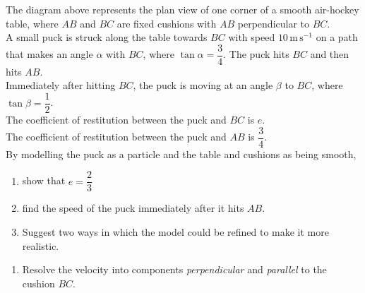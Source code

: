 \documentclass[leqno]{article}
\begin{document}
\begin{enumerate}[
  label=\textbf{\arabic*.},
  leftmargin=*,
  topsep=0pt,
  partopsep=0pt,
  parsep=0pt
]
\begin{figure}[H]
\end{figure}


The diagram above represents the plan view of one corner of a smooth air-hockey table, where $AB$ and $BC$ are fixed cushions with $AB$ perpendicular to $BC$. \\

A small puck is struck along the table towards $BC$ with speed $10\,\mathrm{m\,s^{-1}}$ on a path that makes an angle $\alpha$ with $BC$, where $\tan \alpha = \dfrac{3}{4}$. The puck hits $BC$ and then hits $AB$. \\

Immediately after hitting $BC$, the puck is moving at an angle $\beta$ to $BC$, where $\tan \beta = \dfrac{1}{2}$. \\

The coefficient of restitution between the puck and $BC$ is $e$. \\

The coefficient of restitution between the puck and $AB$ is $\dfrac{3}{4}$. \\

By modelling the puck as a particle and the table and cushions as being smooth, \\

\begin{enumerate}[label=\textbf{(\alph*)}]
  \item show that $e = \dfrac{2}{3}$  \\
  \item find the speed of the puck immediately after it hits $AB$.  \\
  \item Suggest two ways in which the model could be refined to make it more realistic.  \\
\end{enumerate}

\vspace*{10pt}

\begin{djsSolution}
\begin{enumerate}[label=\textbf{(\alph*)}]
  \item Resolve the velocity into components \emph{perpendicular} and \emph{parallel} to the cushion $BC$.


\end{enumerate}
\end{djsSolution}
\end{enumerate}
\end{document}
